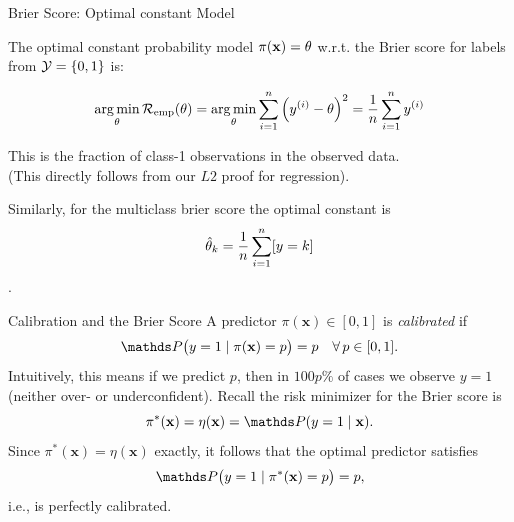 \documentclass[11pt,compress,t,notes=noshow, xcolor=table]{beamer}
\begin{document}
\begin{vbframe}{Brier Score: Optimal constant Model}

The optimal constant probability model $\pi(\mathbf{x}) = \theta$ w.r.t. the Brier score for labels from $\mathcal{Y} = \{0, 1\}$ is:

\vspace*{-0.2cm}

\begin{equation*}
  \mathop{\mathrm{arg\,min}}_{\theta} \mathcal{R}_{\text{emp}}(\theta) = \mathop{\mathrm{arg\,min}}_{\theta} \sum\limits_{i=1}^n \left(y^{(i)} - \theta\right)^2 = \frac{1}{n} \sum\limits_{i=1}^n y^{(i)}
\end{equation*}

This is the fraction of class-1 observations in the observed data.\\
(This directly follows from our $L2$ proof for regression).

\vspace*{0.2cm}

Similarly, for the multiclass brier score the optimal constant is $$\hat{\theta}_k = \frac{1}{n}\sum\limits_{i=1}^n [y = k]$$. 

\end{vbframe}

\begin{vbframe}{Calibration and the Brier Score}
A predictor \(\pi(\mathbf{x})\in[0,1]\) is \emph{calibrated} if 
\[
\P\bigl(y=1 \mid \pi(\mathbf{x})=p\bigr)=p \quad \forall\, p\in[0,1].
\]
Intuitively, this means if we predict $p$, then in $100p\%$ of cases we observe $y=1$ (neither over- or underconfident). Recall the risk minimizer for the Brier score is
\[
\pi^*(\mathbf{x}) = \eta(\mathbf{x}) = \P(y=1 \mid \mathbf{x}).
\]
Since \(\pi^*(\mathbf{x})=\eta(\mathbf{x})\) exactly, it follows that the optimal predictor satisfies
\[
\P\bigl(y=1 \mid \pi^*(\mathbf{x})=p\bigr)=p,
\]
i.e., is perfectly calibrated.
\end{vbframe}
\end{document}
